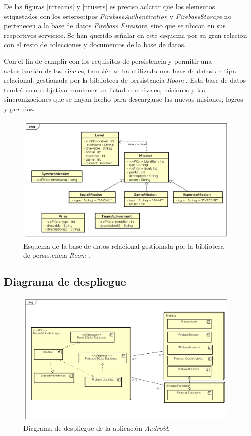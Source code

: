 \documentclass[twoside]{report}
\begin{document}
De las figuras \ref{nrteams} y \ref{nrusers} es preciso aclarar que los elementos etiquetados con los estereotipos \textit{FirebaseAuthentication} y \textit{FirebaseStorage} no pertenecen a la base de datos \textit{Firebase Firestore}, sino que se ubican en sus respectivos servicios. Se han querido señalar en este esquema por su gran relación con el resto de colecciones y documentos de la base de datos.


Con el fin de cumplir con los requisitos de persistencia y permitir una actualización de los niveles, también se ha utilizado una base de datos de tipo relacional, gestionada por la biblioteca de persistencia  \textit{Room} \cite{roompersistence}. Esta base de datos tendrá como objetivo mantener un listado de niveles, misiones y las sincronizaciones que se hayan hecho para descargarse las nuevas misiones, logros y premios.

\begin{figure}[H]
\centering
\includegraphics[scale=0.5]{images/databaseRoom}
\caption{Esquema de la base de datos relacional gestionada por la biblioteca de persistencia \textit{Room} \cite{roompersistence}.}
\end{figure}

\subsection{Diagrama de despliegue}

\begin{figure}[H]
\centering
\includegraphics[scale=0.5]{images/deploymentModel}
\caption{Diagrama de despliegue de la aplicación \textit{Android}.}
\end{figure}
\end{document}
